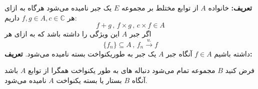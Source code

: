\documentclass[12pt]{report}
\begin{document}
\textbf{تعریف:}
خانواده 
$A$
از توابع مختلط بر مجموعه
$E$
یک جبر نامیده می‌شود هرگاه به ازای هر
$f, g \in A , c \in \mathbb{C}$
داریم:
\[
f + g \, , \, f \times g \,,\, c \times f \in A
\]
اگر جبر 
$A$
این ویژگی را داشته باشد که به ازای هر
\[
\{f_n\} \subseteq A \, , \, f_n  \overset{u.}{\rightarrow} f
\]
داشته باشیم 
$f \in A$
 آنگاه جبر
$A$
یک جبر به طوریکنواخت بسته نامیده می‌شود.
\textbf{تعریف:}

فرض کنید 
$B$
 مجموعه تمام می‌شود دنباله های به طور یکنواخت همگرا از توابع
 $A$
 باشد آنگاه
 $B$
 بستار یا بسته یکنواخت 
 $A$
 نامیده می‌شود.


 
\end{document}
